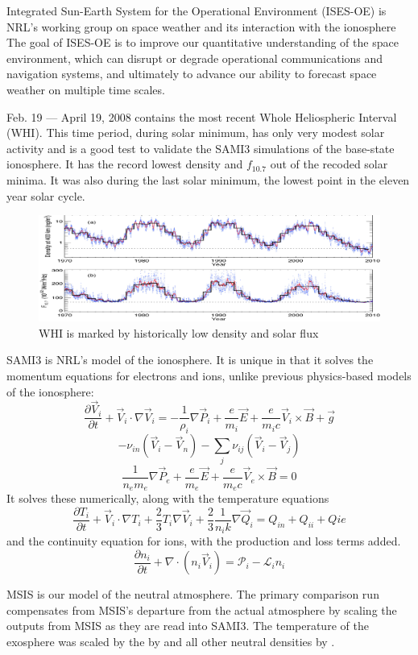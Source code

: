 \documentclass[12pt]{IEEEtran}
\begin{document}
{Integrated Sun-Earth System for the Operational Environment (ISES-OE)} is NRL's working group on space weather and its interaction with the ionosphere
    The goal of ISES-OE is to improve our quantitative understanding of the space environment, which can disrupt or degrade operational communications and navigation systems, and ultimately to advance our ability to forecast space weather on multiple time scales.
  
  Feb. 19 --- April 19, 2008 contains the most recent Whole Heliospheric Interval (WHI).  This time period, during solar minimum, has only very modest solar activity and is a good test to validate the SAMI3 simulations of the base-state ionosphere. It has the record lowest density and $f_{10.7}$ out of the recoded solar minima. It was also during the last solar minimum, the lowest point in the eleven year solar cycle.
  \begin{figure}
    \includegraphics[width=.5\textwidth]{whi}
    \caption{WHI is marked by historically low density and solar flux}
  \end{figure}

  
  SAMI3 is NRL's model of the ionosphere. It is unique in that it solves the momentum equations for electrons and ions, unlike previous physics-based models of the ionosphere:
  \[ \frac{\partial \vec V_i}{\partial t} + \vec V_i \cdot \nabla \vec V_i = 
     -\frac1{\rho_i} \nabla\vec P_i 
     + \frac e{m_i}\vec E + \frac e{m_ic} \vec V_i \times \vec B 
     +\vec g \]
  \[  -\nu_{in} \left( \vec V_i -\vec V_n \right)
     -\sum_j \nu_{ij} \left( \vec V_i -\vec V_j\right) \]
  \[\frac1{n_e m_e} \nabla \vec P_e + \frac e{m_e} \vec E + \frac e{m_ec} \vec V_e \times \vec B = 0 \]
It solves these numerically, along with the temperature equations
  \[\frac{\partial T_i}{\partial t} + \vec V_i \cdot \nabla T_i + \frac23 T_i \nabla \vec V_i 
  +\frac23 \frac1{n_i k} \nabla \vec Q_i =Q_{in} + Q_{ii} +Q{ie} \]
  and the continuity equation for ions, with the production and loss terms added.
  \[ \frac{\partial n_i}{\partial t} + \nabla \cdot \left( n_i\vec V_i \right) = \mathcal P_i - \mathcal L_i n_i \]
  
  MSIS is our model of the neutral atmosphere.  The primary comparison run compensates from MSIS's departure from the actual atmosphere by scaling the outputs from MSIS as they are read into SAMI3. The temperature of the exosphere was scaled by  the \smash{$[O]$} by  and all other neutral densities by . 
\end{document}
